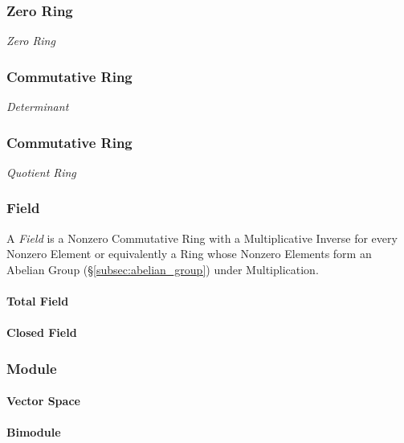 \subsubsection{Zero Ring}

\emph{Zero Ring}



\subsubsection{Commutative Ring}

\emph{Determinant}



\subsubsection{Commutative Ring}

\emph{Quotient Ring}



\subsubsection{Field}\label{subsec:field}

A \emph{Field} is a Nonzero Commutative Ring with a Multiplicative
Inverse for every Nonzero Element or equivalently a Ring whose Nonzero
Elements form an Abelian Group (\S\ref{subsec:abelian_group}) under
Multiplication.



\paragraph{Total Field}\label{subsec:total_field}

\paragraph{Closed Field}\label{subsec:closed_field}



\subsubsection{Module}

\paragraph{Vector Space}\label{subsec:vector_space}

\paragraph{Bimodule}\label{subsec:bimodule}


